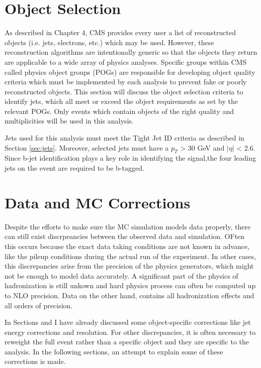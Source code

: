 \section{Object Selection}

As described in Chapter 4, CMS provides every user a list of reconstructed objects (i.e. jets, electrons, etc.) which may be used. However, these reconstruction algorithms are intentionally generic so that the objects they return are applicable to a wide array of physics analyses. Specific groups within CMS called physics object groups (POGs) are responsible for developing object quality criteria which must be implemented by each analysis to prevent fake or poorly reconstructed objects. This section will discuss the object selection criteria to identify jets, which all meet or exceed the object requirements as set by the relevant POGs. Only events which contain objects of the right quality and multiplicities will be used in this analysis.

Jets used for this analysis must meet the Tight Jet ID criteria as described in Section \ref{sec:jets}. Moreover, selected jets must have a $p_{T}$ > 30 GeV and $|\eta|$ < 2.6. Since b-jet identification plays a key role in identifying the signal,the four leading jets on the event are required to be b-tagged.

\section{Data and MC Corrections}

Despite the efforts to make sure the MC simulation models data properly, there can still exist discrpeancies between the observed data and simulation. OFten this occurs because the exact data taking conditions are not known in advance, like the pileup conditions during the actual run of the experiment. In other cases, this discrepancies arise from the precision of the physics generators, which might not be enough to model data accurately. A significant part of the physics of hadronization is still unkown and hard physics process can often be computed up to NLO precision. Data on the other hand, contains all hadronization effects and all orders of precision. 

In Sections and I have already discussed some object-specific corrections like jet energy corrections and resolution. For other discrepancies, it is often necessary to reweight the full event rather than a specific object and they are specific to the analysis. In the following sections, an attempt to explain some of these corrections is made.

